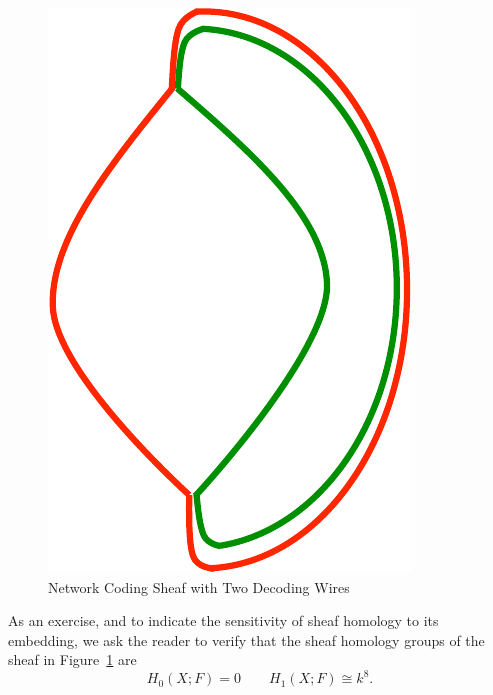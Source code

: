 \begin{figure}[ht]
\centering
\includegraphics[width=.5\textwidth]{nc_2.pdf}
\caption{Network Coding Sheaf with Two Decoding Wires}
\label{fig:nc_2}
\end{figure}

\begin{exr}
As an exercise, and to indicate the sensitivity of sheaf homology to its embedding, we ask the reader to verify that the sheaf homology groups of the sheaf in Figure~\ref{fig:nc_2} are
\[
H_0(X;F)=0 \qquad H_1(X;F)\cong k^8.
\]
\end{exr}
